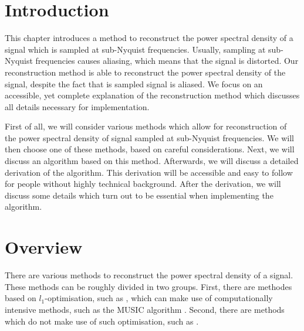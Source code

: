 \documentclass[a4paper, openany, oneside]{memoir}
\begin{document}


\section{Introduction}
This chapter introduces a method to reconstruct the power spectral density of a signal which is sampled at sub-Nyquist frequencies. Usually, sampling at sub-Nyquist frequencies causes aliasing, which means that the signal is distorted. Our reconstruction method is able to reconstruct the power spectral density of the signal, despite the fact that is sampled signal is aliased. We focus on an accessible, yet complete explanation of the reconstruction method which discusses all details necessary for implementation.

First of all, we will consider various methods which allow for reconstruction of the power spectral density of signal sampled at sub-Nyquist frequencies. We will then choose one of these methods, based on careful considerations. Next, we will discuss an algorithm based on this method. Afterwards, we will discuss a detailed derivation of the algorithm. This derivation will be accessible and easy to follow for people without highly technical background. After the derivation, we will discuss some details which turn out to be essential when implementing the algorithm.

\section{Overview}
There are various methods to reconstruct the power spectral density of a signal. These methods can be roughly divided in two groups. First, there are methodes based on $l_1$-optimisation, such as \cite{bayarkernel, candes2006robust, candes2007sparsity, candes2008introduction, kirolos2006analog, li2014gomp, polo2009compressive}, which can make use of computationally intensive methods, such as the MUSIC algorithm \cite{pal2011coprime}. Second, there are methods which do not make use of such optimisation, such as \cite{ariananda2011multicoset,ariananda2012compressive}.
\end{document}
